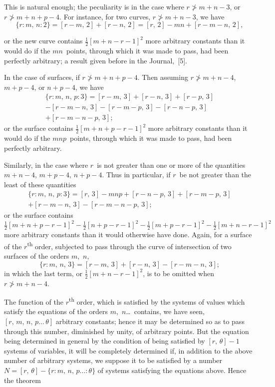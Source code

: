 \documentclass[11pt,a4paper]{book}
\begin{document}
This is natural enough; the peculiarity is in the case where $r \ngtr m+n-3$, or $r \ngtr m+n+p-4$. For instance, for two curves, $r \ngtr m+n-3$, we have
\[
\{r : m,\, n : 2\} = [r-m,\,2] + [r-n,\,2] = [r,\,2] - mn + [r-m-n,\,2],
\]

\newpage
or the new curve contains $\frac{1}{2}[m+n-r-1]^2$ more arbitrary constants than it would do if the $mn$~points, through which it was made to pass, had been perfectly arbitrary; a result given before in the Journal,~[5].

In the case of surfaces, if $r \ngtr m+n+p-4$. Then assuming $r \ngtr m+n-4$, $m+p-4$, or $n+p-4$, we have
\begin{multline*}
\{r : m,\, n,\, p : 3\} = [r-m,\,3] + [r-n,\,3] + [r-p,\,3] \\
- [r-m-n,\,3] - [r-m-p,\,3] - [r-n-p,\,3] \\
+ [r-m-n-p,\,3];
\end{multline*}
or the surface contains $\frac{1}{2}[m+n+p-r-1]^2$ more arbitrary constants than it would do if the $mnp$~points, through which it was made to pass, had been perfectly arbitrary.

Similarly, in the case where $r$~is not greater than one or more of the quantities $m+n-4$, $m+p-4$, $n+p-4$. Thus in particular, if $r$~be not greater than the least of these quantities
\begin{multline*}
\{r : m,\, n,\, p : 3\} = [r,\,3] - mnp + [r-n-p,\,3] + [r-m-p,\,3] \\
+ [r-m-n,\,3] - [r-m-n-p,\,3];
\end{multline*}
or the surface contains
\[
\tfrac{1}{2}[m+n+p-r-1]^2 - \tfrac{1}{2}[n+p-r-1]^2 - \tfrac{1}{2}[m+p-r-1]^2 - \tfrac{1}{2}[m+n-r-1]^2
\]
more arbitrary constants than it would otherwise have done. Again, for a surface of the $r$\textsuperscript{th} order, subjected to pass through the curve of intersection of two surfaces of the orders $m$,~$n$,
\[
\{r : m,\, n,\, 3\} = [r-m,\,3] + [r-n,\,3] - [r-m-n,\,3];
\]
in which the last term, or $\frac{1}{2}[m+n-r-1]^2$, is to be omitted when $r \ngtr m+n-4$.

The function of the $r$\textsuperscript{th} order, which is satisfied by the systems of values which satisfy the equations of the orders $m$,~$n$\ldots\ contains, we have seen, $[r,\,m,\,n,\,p\ldots\,\theta]$ arbitrary constants; hence it may be determined so as to pass through this number, diminished by unity, of arbitrary points. But the equation being determined in general by the condition of being satisfied by $[r,\,\theta]-1$ systems of variables, it will be completely determined if, in addition to the above number of arbitrary systems, we suppose it to be satisfied by a number $N = [r,\,\theta] - \{r : m,\, n,\, p\ldots : \theta\}$ of systems satisfying the equations above. Hence the theorem
\end{document}
